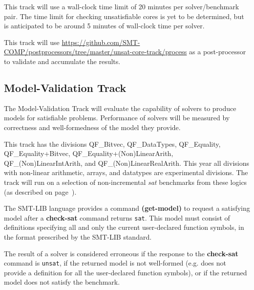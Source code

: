 \documentclass[12pt]{article}
\newcommand{\akey}[1]{\textbf{#1}\xspace}
\newcommand{\mvaltrack}{Model-Validation Track\xspace}
\begin{document}
This track will use a wall-clock time limit of 20 minutes per solver/benchmark
pair. The time limit for checking unsatisfiable cores is yet to be determined,
but is anticipated to be around 5 minutes of wall-clock time per solver.

This track will use
{\url{https://github.com/SMT-COMP/postprocessors/tree/master/unsat-core-track/process}}
as a post-processor
to validate and accumulate the results.

\subsection{\mvaltrack}
\label{sec:exec:model}
The \mvaltrack will evaluate the capability of solvers to produce models for
satisfiable problems.  Performance of solvers will be measured by correctness
and well-formedness of the model they provide.

  This track has the divisions QF\_Bitvec,
QF\_DataTypes, QF\_Equality,
QF\_Equality+Bitvec,
QF\_Equality+(Non)LinearArith,  
QF\_(Non)LinearIntArith, and QF\_(Non)\-LinearRealArith.
This year all divisions with non-linear arithmetic, arrays, and datatypes 
are experimental divisions.
%
The track will run on a
selection of non-incremental \emph{sat} benchmarks from these
logics (as described on page~\pageref{benchmark-selection}).

The SMT-LIB language provides a command \akey{(get-model)} to request a
satisfying model after a \akey{check-sat} command returns \texttt{sat}.  This
model must consist of definitions specifying all and only the current
user-declared function symbols, in the format prescribed by the SMT-LIB
standard.

The result of a solver is considered erroneous if the response to the
\akey{check-sat} command is \texttt{unsat}, if the returned model is not
well-formed (e.g. does not provide a definition for all the user-declared
function symbols), or if the returned model does not satisfy the benchmark.
\end{document}
